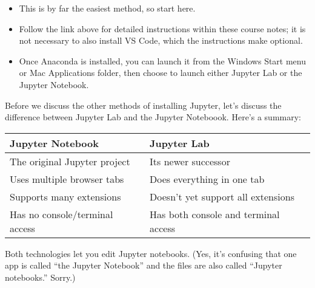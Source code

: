 \documentclass[letterpaper,10pt,english]{sphinxmanual}
\begin{document}
  {\hyperref[\detokenize{anaconda-installation::doc}]{}}
\begin{itemize}
\item {} 
This is by far the easiest method, so start here.

\item {} 
Follow the link above for detailed instructions within these course notes; it is not necessary to also install VS Code, which the instructions make optional.

\item {} 
Once Anaconda is installed, you can launch it from the Windows Start menu or Mac Applications folder, then choose to launch either Jupyter Lab or the Jupyter Notebook.

\end{itemize}

Before we discuss the other methods of installing Jupyter, let’s discuss the difference between Jupyter Lab and the Jupyter Noteboook.  Here’s a summary:


\begin{savenotes}\sphinxattablestart
\centering
\begin{tabulary}{\linewidth}[t]{|T|T|}
\hline
\sphinxstyletheadfamily 
Jupyter Notebook
&\sphinxstyletheadfamily 
Jupyter Lab
\\
\hline
The original Jupyter project
&
Its newer successor
\\
\hline
Uses multiple browser tabs
&
Does everything in one tab
\\
\hline
Supports many extensions
&
Doesn’t yet support all extensions
\\
\hline
Has no console/terminal access
&
Has both console and terminal access
\\
\hline
\end{tabulary}
\par
\sphinxattableend\end{savenotes}

Both technologies let you edit Jupyter notebooks.  (Yes, it’s confusing that one app is called “the Jupyter Notebook” and the files are also called “Jupyter notebooks.”  Sorry.)
\end{document}
